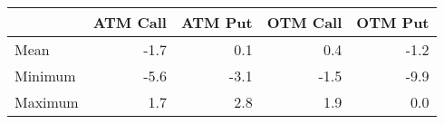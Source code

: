 \begin{tabular}{lrrrr}
\hline
         &   ATM Call &   ATM Put &   OTM Call &   OTM Put \\
\hline
 Mean    &       -1.7 &       0.1 &        0.4 &      -1.2 \\
 Minimum &       -5.6 &      -3.1 &       -1.5 &      -9.9 \\
 Maximum &        1.7 &       2.8 &        1.9 &       0.0 \\
\hline
\end{tabular}